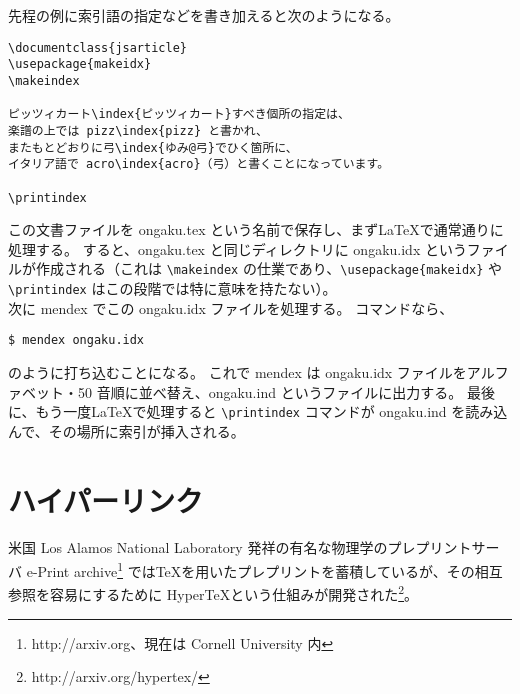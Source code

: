 先程の例に索引語の指定などを書き加えると次のようになる。
\begin{mdframed}[roundcorner=0.50zw,leftmargin=3.00zw,rightmargin=3.00zw,skipabove=0.40zw,skipbelow=0.40zw,innertopmargin=4.00pt,innerbottommargin=4.00pt,innerleftmargin=5.00pt,innerrightmargin=5.00pt,linecolor=gray!020,linewidth=0.50pt,backgroundcolor=gray!20]
\begin{verbatim}
\documentclass{jsarticle}
\usepackage{makeidx}
\makeindex

ピッツィカート\index{ピッツィカート}すべき個所の指定は、
楽譜の上では pizz\index{pizz} と書かれ、
またもとどおりに弓\index{ゆみ@弓}でひく箇所に、
イタリア語で acro\index{acro}（弓）と書くことになっています。

\printindex

\end{verbatim}
\end{mdframed}
この文書ファイルを ongaku.tex という名前で保存し、まず\LaTeX{}で通常通りに処理する。
すると、ongaku.tex と同じディレクトリに ongaku.idx というファイルが作成される（これは \verb'\makeindex' の仕業であり、\verb'\usepackage{makeidx}' や \verb'\printindex' はこの段階では特に意味を持たない）。\\

次に mendex でこの ongaku.idx ファイルを処理する。
コマンドなら、
\begin{mdframed}[roundcorner=0.50zw,leftmargin=3.00zw,rightmargin=3.00zw,skipabove=0.40zw,skipbelow=0.40zw,innertopmargin=4.00pt,innerbottommargin=4.00pt,innerleftmargin=5.00pt,innerrightmargin=5.00pt,linecolor=gray!090,linewidth=0.50pt,backgroundcolor=gray!90]\color{gray!10}
\begin{verbatim}
$ mendex ongaku.idx
\end{verbatim}
\end{mdframed}
のように打ち込むことになる。
これで mendex は ongaku.idx ファイルをアルファベット・50 音順に並べ替え、ongaku.ind というファイルに出力する。
最後に、もう一度\LaTeX{}で処理すると \verb'\printindex' コマンドが ongaku.ind を読み込んで、その場所に索引が挿入される。\enlargethispage{+1.65zw}
\section{ハイパーリンク}
米国 Los Alamos National Laboratory 発祥の有名な物理学のプレプリントサーバ e-Print archive\footnote{http://arxiv.org、現在は Cornell University 内} では\TeX{}を用いたプレプリントを蓄積しているが、その相互参照を容易にするために Hyper\TeX{}という仕組みが開発された\footnote{http://arxiv.org/hypertex/}。\\

